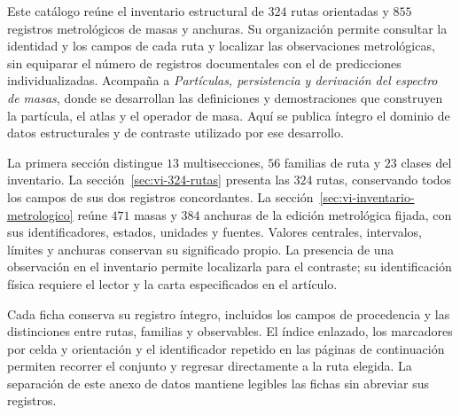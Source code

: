 \documentclass[a4paper,10pt]{article}
\begin{document}
\begin{minipage}{\textwidth}
Este catálogo reúne el inventario estructural de \(324\) rutas orientadas
y \(855\) registros metrológicos de masas y anchuras. Su organización
permite consultar la identidad y los campos de cada ruta y localizar las
observaciones metrológicas, sin equiparar el número de registros documentales con el
de predicciones individualizadas. Acompaña a \emph{Partículas,
persistencia y derivación del espectro de masas}, donde se desarrollan
las definiciones y demostraciones que construyen la partícula, el atlas
y el operador de masa. Aquí se publica íntegro el dominio de datos
estructurales y de contraste utilizado por ese desarrollo.

La primera sección distingue \(13\) multisecciones, \(56\) familias de
ruta y \(23\) clases del inventario. La
sección~\ref{sec:vi-324-rutas} presenta las \(324\) rutas, conservando
todos los campos de sus dos registros concordantes. La
sección~\ref{sec:vi-inventario-metrologico} reúne \(471\) masas y
\(384\) anchuras de la edición metrológica fijada, con sus identificadores,
estados, unidades y fuentes. Valores centrales, intervalos, límites y
anchuras conservan su significado propio. La presencia de una
observación en el inventario permite localizarla para el contraste;
su identificación física requiere el lector y la carta especificados
en el artículo.

Cada ficha conserva su registro íntegro, incluidos los campos de
procedencia y las distinciones entre rutas, familias y observables. El
índice enlazado, los marcadores por celda y orientación y el identificador
repetido en las páginas de continuación permiten recorrer el conjunto y
regresar directamente a la ruta elegida. La separación de este anexo de
datos mantiene legibles las fichas sin abreviar sus registros.\par
\end{minipage}
\par\endgroup
\clearpage
\tableofcontents
\clearpage


\end{document}
